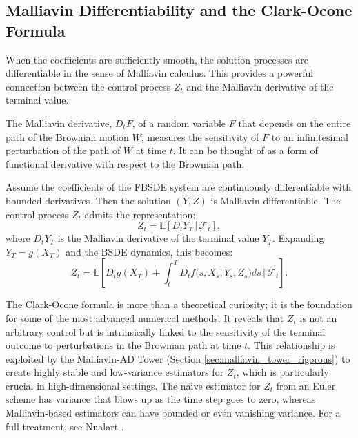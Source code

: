\subsection{Malliavin Differentiability and the Clark-Ocone Formula}
\label{sec:malliavin_clark_ocone}

When the coefficients are sufficiently smooth, the solution processes are differentiable in the sense of Malliavin calculus. This provides a powerful connection between the control process \(Z_t\) and the Malliavin derivative of the terminal value.

\begin{definition}
The Malliavin derivative, \(D_t F\), of a random variable \(F\) that depends on the entire path of the Brownian motion \(W\), measures the sensitivity of \(F\) to an infinitesimal perturbation of the path of \(W\) at time \(t\). It can be thought of as a form of functional derivative with respect to the Brownian path.
\end{definition}

\begin{proposition}
\label{prop:clark_ocone}
Assume the coefficients of the FBSDE system are continuously differentiable with bounded derivatives. Then the solution \((Y,Z)\) is Malliavin differentiable. The control process \(Z_t\) admits the representation:
\[
  Z_t = \mathbb E\!\left[
      D_t Y_T
      \,\Big|\,\mathcal F_t\right],
\]
where \(D_t Y_T\) is the Malliavin derivative of the terminal value \(Y_T\). Expanding \(Y_T = g(X_T)\) and the BSDE dynamics, this becomes:
\[
  Z_t = \mathbb E\!\left[
      D_t g(X_T)
      +\int_t^T D_t f\bigl(s,X_s,Y_s,Z_s\bigr) ds
      \,\Big|\,\mathcal F_t\right].
\]
\end{proposition}

\begin{remark}
The Clark-Ocone formula is more than a theoretical curiosity; it is the foundation for some of the most advanced numerical methods. It reveals that \(Z_t\) is not an arbitrary control but is intrinsically linked to the sensitivity of the terminal outcome to perturbations in the Brownian path at time \(t\). This relationship is exploited by the Malliavin-AD Tower (Section \ref{sec:malliavin_tower_rigorous}) to create highly stable and low-variance estimators for \(Z_t\), which is particularly crucial in high-dimensional settings. The naive estimator for \(Z_t\) from an Euler scheme has variance that blows up as the time step goes to zero, whereas Malliavin-based estimators can have bounded or even vanishing variance. For a full treatment, see Nualart \cite{Nualart2006}.
\end{remark}

